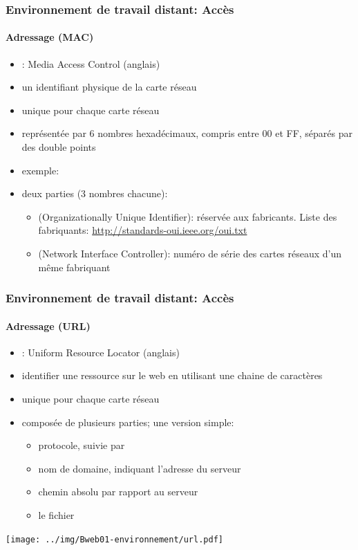 \documentclass[xcolor=table]{beamer}
\begin{document}
\begin{frame}
\frametitle{Environnement de travail distant: Accès}
\framesubtitle{Adressage (MAC)}

\begin{itemize}
	\item {}: Media Access Control (anglais)
	\item un identifiant physique de la carte réseau 
	\item unique pour chaque carte réseau  
	\item représentée par 6 nombres hexadécimaux, compris entre 00 et FF, séparés par des double points
	\item exemple: 
	\item deux parties (3 nombres chacune): 
	\begin{itemize}
		\item {} (Organizationally Unique Identifier): réservée aux fabricants. 
		Liste des fabriquants: \url{http://standards-oui.ieee.org/oui.txt}
		\item {} (Network Interface Controller): numéro de série des cartes réseaux d'un même fabriquant
	\end{itemize}
\end{itemize}

\end{frame}

\begin{frame}
\frametitle{Environnement de travail distant: Accès}
\framesubtitle{Adressage (URL)}

\begin{itemize}
	\item {}: Uniform Resource Locator (anglais)
	\item identifier une ressource sur le web en utilisant une chaine de caractères
	\item unique pour chaque carte réseau  
	\item composée de plusieurs parties; une version simple: 
	\begin{itemize}
		\item protocole, suivie par \keyword{://}
		\item nom de domaine, indiquant l'adresse du serveur
		\item chemin absolu par rapport au serveur 
		\item le fichier 
	\end{itemize}
\end{itemize}

\texttt{[image: ../img/Bweb01-environnement/url.pdf]}

\end{frame}
\end{document}
